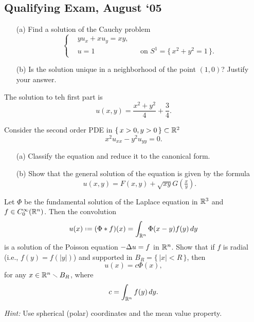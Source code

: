 \subsection{Qualifying Exam, August `05}
\begin{problem}
  \hfill
  \begin{itemize}[noitemsep]
  \item[(a)] Find a solution of the Cauchy problem
    \[
      \left\{
        \begin{aligned}
          &yu_x+xu_y=xy,\\
          &u=1&&\text{on \(S^1=\bigl\{\,x^2+y^2=1\,\bigr\}\)}.
        \end{aligned}
      \right.
    \]
  \item[(b)] Is the solution unique in a neighborhood of the point
    \((1,0)\)? Justify your answer.
  \end{itemize}
\end{problem}
\begin{solution*}
  The solution to teh first part is
  \[
    u(x,y)=\frac{x^2+y^2}{4}+\frac{3}{4}.
  \]
\end{solution*}

\begin{problem}
  Consider the second order PDE in \(\{\,x>0,y>0\,\}\subset\mathbb{R}^2\)
  \[
    x^2u_{xx}-y^2u_{yy}=0.
  \]
  \begin{itemize}[noitemsep]
  \item[(a)] Classify the equation and reduce it to the canonical form.
  \item[(b)] Show that the general solution of the equation is given by the
    formula
    \[
      u(x,y)=F(x,y)+\sqrt{xy}G(\tfrac{x}{y}).
    \]
  \end{itemize}
\end{problem}
\begin{solution*}
\end{solution*}

\begin{problem}
  Let \(\Phi\) be the fundamental solution of the Laplace equation in
  \(\mathbb{R}^3\) and \(f\in C_0^\infty(\mathbb{R}^n)\). Then the convolution
  \[
    u(x)\defeq(\Phi*f)(x)=\int_{\R^n}\Phi(x-y)f(y)\diff y
  \]
  is a solution of the Poisson equation \(-\Delta u=f\) in \(\mathbb{R}^n\). Show
  that if \(f\) is radial (i.e., \(f(y)=f(|y|)\)) and supported in
  \(B_R=\{\,|x|<R\,\}\), then
  \[
    u(x)=c\Phi(x),
  \]
  for any \(x\in\mathbb{R}^n\smallsetminus B_R\), where
  \[
    c=\int_{\mathbb{R}^n}f(y)\mathop{}\!d y.
  \]

  \noindent\emph{Hint:} Use spherical (polar) coordinates and the mean value
  property.
\end{problem}
\begin{solution*}
\end{solution*}

